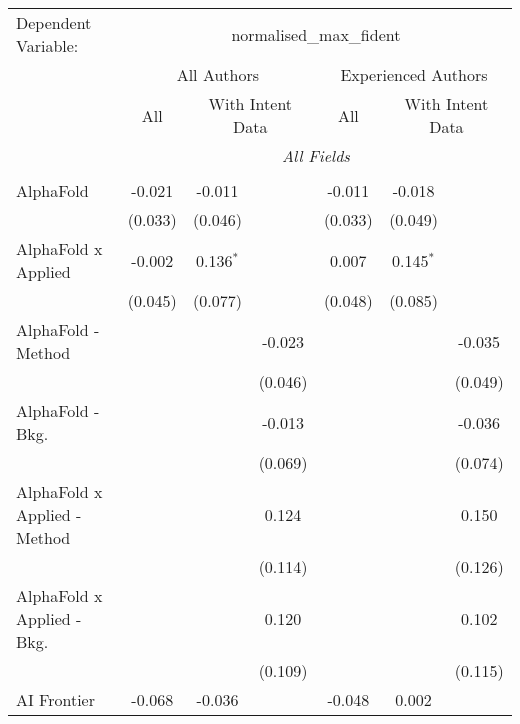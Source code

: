 \begingroup
\centering
\begin{tabular}{lcccccc}
   \tabularnewline \midrule \midrule
   Dependent Variable: & \multicolumn{6}{c}{normalised\_max\_fident}\\
 & \multicolumn{3}{c}{All Authors} & \multicolumn{3}{c}{Experienced Authors} \\
\cmidrule(lr){2-4} \cmidrule(lr){5-7}
 & \multicolumn{1}{c}{All} & \multicolumn{2}{c}{With Intent Data} & \multicolumn{1}{c}{All} & \multicolumn{2}{c}{With Intent Data} \\
\cmidrule(lr){2-2} \cmidrule(lr){3-4} \cmidrule(lr){5-5} \cmidrule(lr){6-7}
 & \multicolumn{6}{c}{\textit{All Fields}} \\ \\
   AlphaFold                      & -0.021  & -0.011      &                & -0.011  & -0.018      &   \\   
                                  & (0.033) & (0.046)     &                & (0.033) & (0.049)     &   \\   
   AlphaFold x Applied            & -0.002  & 0.136$^{*}$ &                & 0.007   & 0.145$^{*}$ &   \\   
                                  & (0.045) & (0.077)     &                & (0.048) & (0.085)     &   \\   
   AlphaFold - Method             &         &             & -0.023         &         &             & -0.035\\   
                                  &         &             & (0.046)        &         &             & (0.049)\\   
   AlphaFold - Bkg.               &         &             & -0.013         &         &             & -0.036\\   
                                  &         &             & (0.069)        &         &             & (0.074)\\   
   AlphaFold x Applied - Method   &         &             & 0.124          &         &             & 0.150\\   
                                  &         &             & (0.114)        &         &             & (0.126)\\   
   AlphaFold x Applied - Bkg.     &         &             & 0.120          &         &             & 0.102\\   
                                  &         &             & (0.109)        &         &             & (0.115)\\   
   AI Frontier                    & -0.068  & -0.036      &                & -0.048  & 0.002       &   \\   

\end{tabular}
